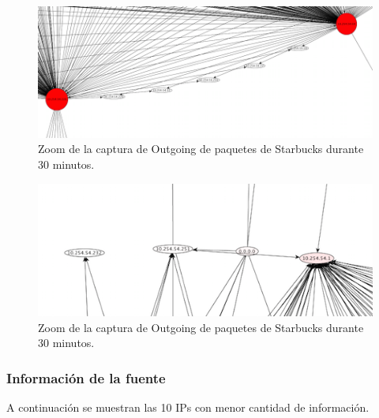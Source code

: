 \documentclass[10pt, a4paper]{article}
\begin{document}
\begin{figure}[H] %
\begin{center}
\includegraphics[width=450pt]{../imgs/zoom-starbucks-outgoing.png}
\caption{Zoom de la captura de Outgoing de paquetes de Starbucks durante 30 minutos.}
\end{center}
\end{figure}

\begin{figure}[H] %
\begin{center}
\includegraphics[width=450pt]{../imgs/zoom-starbucks-outgoing2.png}
\caption{Zoom de la captura de Outgoing de paquetes de Starbucks durante 30 minutos.}
\end{center}
\end{figure}

\subsubsection{Información de la fuente}

A continuación se muestran las 10 IPs con menor cantidad de información.
\end{document}
